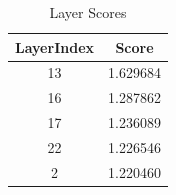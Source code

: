 
\begin{table}[h]
\centering
\begin{tabular}{|c|c|}
\hline
LayerIndex & Score \\
\hline
13 & 1.629684 \\
\hline
16 & 1.287862 \\
\hline
17 & 1.236089 \\
\hline
22 & 1.226546 \\
\hline
2 & 1.220460 \\
\hline
\end{tabular}
\caption{Layer Scores}
\end{table}
